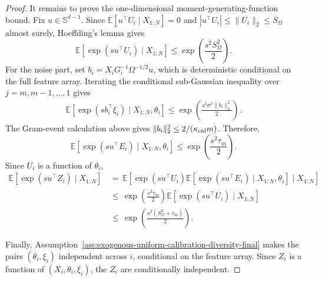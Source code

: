 \documentclass{article} %
\begin{document}
\begin{proof}
It remains to prove the one-dimensional moment-generating-function bound.
Fix \(u\in\mathbb{S}^{d-1}\). Since
\(\mathbb{E}[u^\top U_i\mid X_{1:N}]=0\) and
\(|u^\top U_i|\leq\|U_i\|_2\leq S_\Omega\) almost surely, Hoeffding's lemma
gives
\begin{equation}
\mathbb{E}\!\left[
\exp(su^\top U_i)\mid X_{1:N}
\right]
\leq
\exp\!\left(\frac{s^2S_\Omega^2}{2}\right).
\end{equation}
For the noise part, set
\(b_i=X_iG_i^{-1}\Omega^{-1/2}u\), which is deterministic conditional on the
full feature array. Iterating the
conditional sub-Gaussian inequality over \(j=m,m-1,\ldots,1\) gives
\begin{equation}
\begin{aligned}
\mathbb{E}\!\left[
\exp(sb_i^\top\xi_i)
\mid X_{1:N},\theta_i
\right]
\leq
\exp\!\left(\frac{s^2\sigma^2\|b_i\|_2^2}{2}\right).
\end{aligned}
\end{equation}
The Gram-event calculation above gives
\(\|b_i\|_2^2\leq2/(\kappa_{\rm cal}m)\). Therefore,
\begin{equation}
\mathbb{E}\!\left[
\exp(su^\top E_i)
\mid X_{1:N},\theta_i
\right]
\leq
\exp\!\left(\frac{s^2\tau_m}{2}\right).
\end{equation}
Since \(U_i\) is a function of \(\theta_i\),
\begin{equation}
\begin{aligned}
\mathbb{E}\!\left[
\exp(su^\top Z_i)\mid X_{1:N}
\right]
&\,=\,
\mathbb{E}\!\left[
\exp(su^\top U_i)
\mathbb{E}\!\left[
\exp(su^\top E_i)
\mid X_{1:N},\theta_i
\right]
\mid X_{1:N}
\right]
\\
&\,\leq\,
\exp\!\left(\frac{s^2\tau_m}{2}\right)
\mathbb{E}\!\left[
\exp(su^\top U_i)\mid X_{1:N}
\right]
\\
&\,\leq\,
\exp\!\left(\frac{s^2(S_\Omega^2+\tau_m)}{2}\right).
\end{aligned}
\end{equation}

Finally, Assumption~\ref{ass:exogenous-uniform-calibration-diversity-final}
makes the pairs \((\theta_i,\xi_i)\) independent across \(i\), conditional on
the feature array. Since \(Z_i\) is a function of
\((X_i,\theta_i,\xi_i)\), the \(Z_i\) are conditionally independent.
\end{proof}
\end{document}
